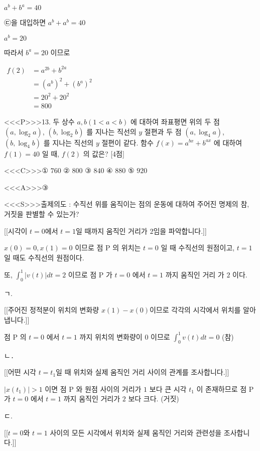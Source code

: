\documentclass{oblivoir}
\begin{document}
$a^{b}+b^{a}=40$

㉢을 대입하면 $a^{b}+a^{b}=40$

$a^{b}=20$

따라서 $b^{a}=20$ 이므로

$\begin{aligned} f(2) &=a^{2 b}+b^{2 a} \\ &=\left(a^{b}\right)^{2}+\left(b^{a}\right)^{2} \\ &=20^{2}+20^{2} \\ &=800 \end{aligned}$


<<<P>>>13. 두 상수 $a, b(1<  a<  b)$ 에 대하여 좌표평면 위의 두 점 $\left(a, \log _{2} a\right)$, $\left(b, \log _{2} b\right)$ 를 지나는 직선의 $y$ 절편과 두 점 $\left(a, \log _{4} a\right)$, $\left(b, \log _{4} b\right)$ 를 지나는 직선의 $y$ 절편이 같다. 함수 $f(x)=a^{b x}+b^{a x}$ 에 대하여 $f(1)=40$ 일 때, $f(2)$ 의 값은? [4점]

<<<C>>>① $760$
② $800$
③ $840$
④ $880$
⑤ $920$


<<<A>>>③

<<<S>>>출제의도 : 수직선 위를 움직이는 점의 운동에 대하여 주어진 명제의 참, 거짓을 판별할 수 있는가?

[[시각이 $t=0$에서 $t=1$일 때까지 움직인 거리가 $2$임을 파악합니다.]]

$x(0)=0, x(1)=0$ 이므로 점 $\mathrm{P}$ 의 위치는 $t=0$ 일 때 수직선의 원점이고, $t=1$ 일 때도 수직선의 원점이다.

또, $\displaystyle\int_{0}^{1}|v(t)| d t=2$ 이므로 점 $\mathrm{P}$ 가 $t=0$ 에서 $t=1$ 까지 움직인 거리 가 $2$ 이다.


ㄱ. 

[[주어진 정적분이 위치의 변화량 $x(1)-x(0)$이므로 각각의 시각에서 위치를 알아냅니다.]]

점 $\mathrm{P}$ 의 $t=0$ 에서 $t=1$ 까지 위치의 변화량이 $0$ 이므로
$\displaystyle\int_{0}^{1} v(t) d t=0$ (참)

ㄴ․

[[어떤 시각 $t=t_{1}$일 때 위치와 실제 움직인 거리 사이의 관계를 조사합니다.]]

$\left|x\left(t_{1}\right)\right|>1$ 이면 점 $\mathrm{P}$ 와 원점 사이의 거리가 $1$ 보다 큰 시각 $t_{1}$ 이 존재하므로 점 $\mathrm{P}$ 가 $t=0$ 에서 $t=1$ 까지 움직인 거리가 $2$ 보다 크다. (거짓)

ㄷ.

[[$t=0$와 $t=1$ 사이의 모든 시각에서 위치와 실제 움직인 거리와 관련성을 조사합니다.]]
\end{document}

